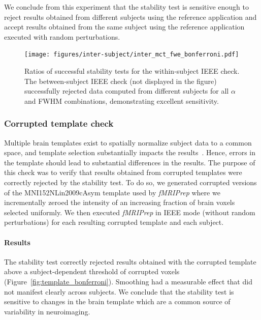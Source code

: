 \documentclass[lettersize,journal]{IEEEtran}
\newcommand{\fmriprep}{\emph{fMRIPrep}\xspace}
\begin{document}
{We conclude from this experiment that the stability test is sensitive enough to reject results obtained from different subjects using the reference application and accept results obtained from the same subject using the reference application executed with random perturbations.

\begin{figure}
  \centering
  \texttt{[image: figures/inter-subject/inter\_mct\_fwe\_bonferroni.pdf]}
  \caption{Ratios of successful stability tests for the within-subject IEEE check. The between-subject IEEE check (not displayed in the figure) successfully rejected data computed from different subjects for all $\alpha$ and FWHM combinations, demonstrating excellent sensitivity.
  }
  \label{fig:ieee-check}
\end{figure}

\subsubsection{Corrupted template check}
\label{subsec:template_check}

Multiple brain templates exist to spatially normalize subject data to a common space, and template selection substantially impacts the results~\cite{li2021moving}. Hence, errors in the template should lead to substantial differences in the results. The purpose of this check was to verify that results obtained from corrupted templates were correctly rejected by the stability test.
To do so, we generated corrupted versions of the MNI152NLin2009cAsym template used by \fmriprep where we incrementally zeroed the intensity of an increasing fraction of brain voxels selected uniformly. We then executed \fmriprep in IEEE mode (without random perturbations) for each resulting corrupted template and each subject.

\paragraph*{Results} The stability test correctly rejected results obtained with the corrupted template above a subject-dependent threshold of corrupted voxels (Figure~\ref{fig:template_bonferroni}). Smoothing had a measurable effect that did not manifest clearly across subjects. We conclude that the stability test is sensitive to changes in the brain template which are a common source of variability in neuroimaging.

}
\end{document}
